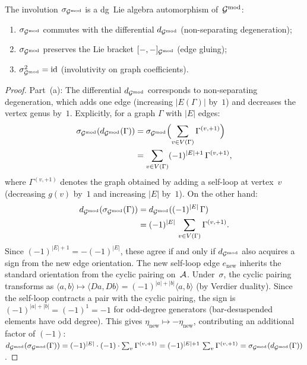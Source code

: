 \begin{lemma}
\label{lem:thqg-IV-verdier-graph-composition}
The involution $\sigma_{\mathcal{G}^{\mathrm{mod}}}$ is a dg~Lie algebra automorphism
of~$\mathcal{G}^{\mathrm{mod}}$:
\begin{enumerate}[label=\textup{(\alph*)}]
\item $\sigma_{\mathcal{G}^{\mathrm{mod}}}$ commutes with the differential
 $d_{\mathcal{G}^{\mathrm{mod}}}$ (non-separating degeneration);
\item $\sigma_{\mathcal{G}^{\mathrm{mod}}}$ preserves the Lie bracket
 $[-,-]_{\mathcal{G}^{\mathrm{mod}}}$ (edge gluing);
\item $\sigma_{\mathcal{G}^{\mathrm{mod}}}^2 = \mathrm{id}$ (involutivity on graph coefficients).
\end{enumerate}
\end{lemma}

\begin{proof}
Part~(a): The differential $d_{\mathcal{G}^{\mathrm{mod}}}$ corresponds to
non-separating degeneration, which adds one edge (increasing
$|E(\Gamma)|$ by~$1$) and decreases the vertex genus by~$1$.
Explicitly, for a graph $\Gamma$ with $|E|$ edges:
\begin{align*}
\sigma_{\mathcal{G}^{\mathrm{mod}}}(d_{\mathcal{G}^{\mathrm{mod}}}(\Gamma))
&= \sigma_{\mathcal{G}^{\mathrm{mod}}}\Bigl(\sum_{v \in V(\Gamma)} \Gamma^{(v,+1)}\Bigr) \\
&= \sum_{v \in V(\Gamma)} (-1)^{|E|+1}\,\Gamma^{(v,+1)},
\end{align*}
where $\Gamma^{(v,+1)}$ denotes the graph obtained by adding a self-loop
at vertex~$v$ (decreasing $g(v)$ by~$1$ and increasing $|E|$ by~$1$).
On the other hand:
\begin{align*}
d_{\mathcal{G}^{\mathrm{mod}}}(\sigma_{\mathcal{G}^{\mathrm{mod}}}(\Gamma))
&= d_{\mathcal{G}^{\mathrm{mod}}}((-1)^{|E|}\,\Gamma) \\
&= (-1)^{|E|}\,\sum_{v \in V(\Gamma)} \Gamma^{(v,+1)}.
\end{align*}
Since $(-1)^{|E|+1} = -(-1)^{|E|}$, these agree if and only if
$d_{\mathcal{G}^{\mathrm{mod}}}$ also acquires a sign from the new edge orientation.
The new self-loop edge $e_{\text{new}}$ inherits the standard
orientation from the cyclic pairing on~$\mathcal{A}$. Under~$\sigma$,
the cyclic pairing transforms as
$\langle a, b \rangle \mapsto \langle Da, Db \rangle
= (-1)^{|a|+|b|}\langle a, b \rangle$ (by Verdier duality).
Since the self-loop contracts a pair with the cyclic pairing,
the sign is $(-1)^{|a|+|b|} = (-1)^1 = -1$ for odd-degree
generators (bar-desuspended elements have odd degree).
This gives $\eta_{\text{new}} \mapsto -\eta_{\text{new}}$, contributing an
additional factor of $(-1)$:
$d_{\mathcal{G}^{\mathrm{mod}}}(\sigma_{\mathcal{G}^{\mathrm{mod}}}(\Gamma))
= (-1)^{|E|} \cdot (-1) \cdot \sum_v \Gamma^{(v,+1)}
= (-1)^{|E|+1}\,\sum_v \Gamma^{(v,+1)}
= \sigma_{\mathcal{G}^{\mathrm{mod}}}(d_{\mathcal{G}^{\mathrm{mod}}}(\Gamma))$.


\end{proof}
